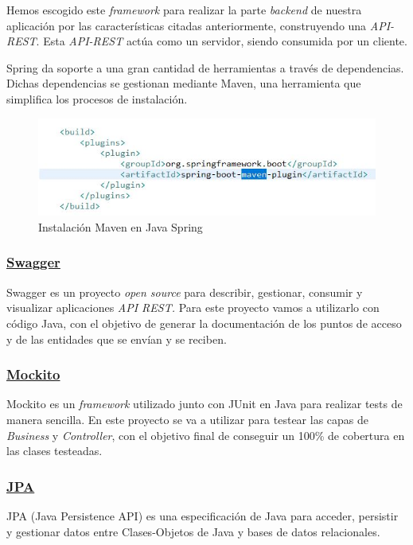      Hemos escogido este \textit{framework} para realizar la parte \textit{backend} de nuestra aplicación por las características citadas anteriormente, construyendo una \textit{API-REST}. Esta \textit{API-REST} actúa como un servidor, siendo consumida por un cliente.
     \newline
    
    Spring da soporte a una gran cantidad de herramientas a través de dependencias. Dichas dependencias se gestionan mediante Maven\cite{maven}, una herramienta que simplifica los procesos de instalación.
    
    \begin{figure}[h]
    \centering
    \includegraphics[width=1\textwidth]{images/maven}
    \caption{Instalación Maven en Java Spring}
    \end{figure}
    
    

        \subsubsection{\underline{Swagger}}
        Swagger\cite{swagger} es un proyecto \textit{open source} para describir, gestionar, consumir y visualizar aplicaciones \textit{API REST.} Para este proyecto vamos a utilizarlo con código Java, con el objetivo de generar la documentación de los puntos de acceso y de las entidades que se envían y se reciben.

        
        \subsubsection{\underline{Mockito}}
        Mockito\cite{mockito} es un \textit{framework} utilizado junto con JUnit\cite{junit} en Java para realizar tests de manera sencilla. En este proyecto se va a utilizar para testear las capas de \emph{Business} y \emph{Controller}, con el objetivo final de conseguir un 100\% de cobertura en las clases testeadas.
        \newline
        

        \subsubsection{\underline{JPA}}
        JPA\cite{jpa} (Java Persistence API) es una especificación de Java para acceder, persistir y gestionar datos entre Clases-Objetos de Java y bases de datos relacionales.
        \newline
        
